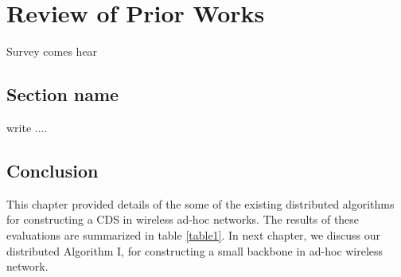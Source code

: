 \chapter{Review of Prior Works}

Survey comes hear

\section{Section name}

write ....

\section{Conclusion}

This chapter provided details of the some of the existing
distributed algorithms for constructing a CDS in wireless ad-hoc
networks. The results of these evaluations are summarized in table
\ref{table1}. In next chapter, we discuss our distributed
Algorithm I, for constructing a small backbone in ad-hoc wireless
network.

